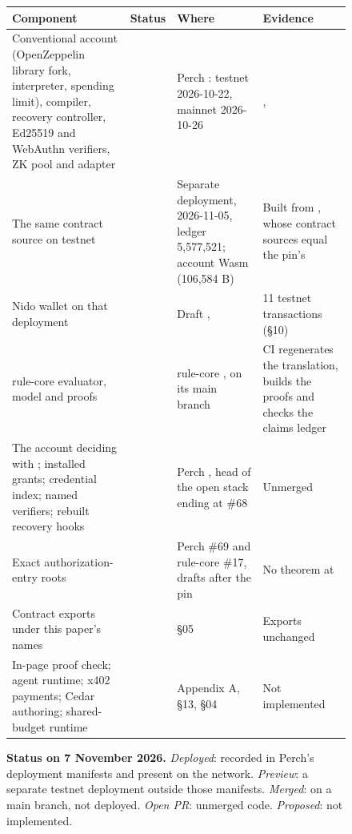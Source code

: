 \begin{figure}[tbp]
\centering
\footnotesize\begin{tabularx}{\linewidth}{@{}LLLL@{}}
\toprule
\textbf{Component} & \textbf{Status} & \textbf{Where} & \textbf{Evidence} \\
\midrule
Conventional account (OpenZeppelin library fork, interpreter, spending limit), compiler, recovery controller, Ed25519 and WebAuthn verifiers, ZK pool and adapter &  & Perch : testnet 2026-10-22, mainnet 2026-10-26 & ,  \\
The same contract source on testnet &  & Separate deployment, 2026-11-05, ledger 5,577,521; account Wasm  (106,584 B) & Built from , whose contract sources equal the pin's \\
Nido wallet on that deployment &  & Draft ,  & 11 testnet transactions (\S{}10) \\
rule-core evaluator, model and proofs &  & rule-core , on its main branch & CI regenerates the translation, builds the proofs and checks the claims ledger \\
The account deciding with ; installed grants; credential index; named verifiers; rebuilt recovery hooks &  & Perch , head of the open stack ending at \#68 & Unmerged \\
Exact authorization-entry roots &  & Perch \#69 and rule-core \#17, drafts after the pin & No theorem at  \\
Contract exports under this paper's names &  & \S{}05 & Exports unchanged \\
In-page proof check; agent runtime; x402 payments; Cedar authoring; shared-budget runtime &  & Appendix A, \S{}13, \S{}04 & Not implemented \\
\bottomrule
\end{tabularx}
\caption{\textbf{Status on 7 November 2026.} \emph{Deployed}: recorded in Perch's deployment manifests and present on the network. \emph{Preview}: a separate testnet deployment outside those manifests. \emph{Merged}: on a main branch, not deployed. \emph{Open PR}: unmerged code. \emph{Proposed}: not implemented.}\label{fig:fig-3}
\end{figure}
